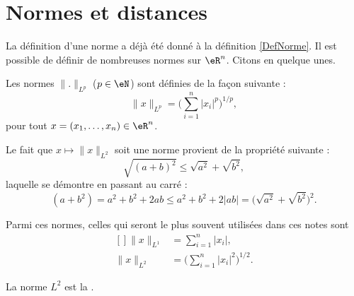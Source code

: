 
\section{Normes et distances}\label{Sect_definition}

La définition d'une norme a déjà été donné à la définition \ref{DefNorme}. Il est possible de définir de nombreuses normes sur $\eR^n$. Citons en quelque unes. 

\begin{definition}
    Les normes $\| . \|_{L^p}$ ($p\in\eN$) sont définies de la façon suivante :
    \begin{equation}		\label{EqDeformeLp}
        \| x \|_{L^p}=\Big( \sum_{i=1}^n| x_i |^p\Big)^{1/p},
    \end{equation}
    pour tout $x=(x_1,\ldots,x_n)\in\eR^n$. 
\end{definition}

Le fait que \( x\mapsto\| x \|_{L^2}\) soit une norme provient de la propriété suivante :
\begin{equation}
    \sqrt{ (a+b)^2 }\leq \sqrt{ a^2 }+\sqrt{ b^2 },
\end{equation}
laquelle se démontre en passant au carré :
\begin{equation}        \label{EQooRYNYooTzZpPz}
    (a+b^2)=a^2+b^2+2ab\leq a^2+b^2+2| ab |=\big( \sqrt{ a^2 }+\sqrt{ b^2 } \big)^2.
\end{equation}

Parmi ces normes, celles qui seront le plus souvent utilisées dans ces notes sont
\begin{equation}
	\begin{aligned}[]
		\| x \|_{L^1}&=\sum_{i=1}^n| x_i |,\\
		\| x \|_{L^2}&=\Big( \sum_{i=1}^n| x_i |^2 \Big)^{1/2}.
	\end{aligned}
\end{equation}

\begin{definition}
    La norme $L^2$ est la . 
\end{definition}

